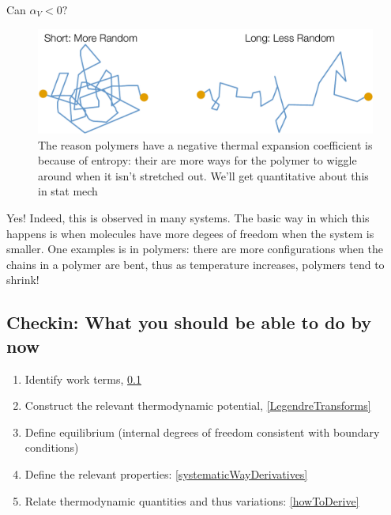 \documentclass[12pt]{article}
\begin{document}
Can $\alpha_V < 0?$  
\begin{figure}[h]
\centering
\includegraphics[width=\textwidth]{Short_and_Long_Comparison}
\caption{The reason polymers have a negative thermal expansion coefficient is because of entropy: their are more ways for the polymer to wiggle around when it isn't stretched out. We'll get quantitative about this in stat mech}
\label{shortLongEntropy}
\end{figure}
Yes! Indeed, this is observed in many systems. The basic way in which this happens is when molecules have more degees of freedom when the system is smaller. One examples is in polymers: there are more configurations when the chains in a polymer are bent, thus as temperature increases, polymers tend to shrink!


\subsection{Checkin: What you should be able to do by now}

\begin{enumerate}[(1)]
\item Identify work terms, \ref{}
\item Construct the relevant thermodynamic potential, \ref{LegendreTransforms}
\item Define equilibrium (internal degrees of freedom consistent with boundary conditions) 
\item Define the relevant properties: \ref{systematicWayDerivatives}
\item Relate thermodynamic quantities and thus variations: \ref{howToDerive}
\end{enumerate}
\end{document}
